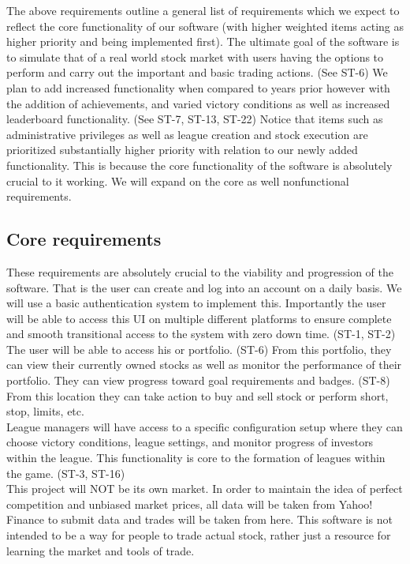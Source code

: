 The above requirements outline a general list of requirements which we expect to reflect the
core functionality of our software (with higher weighted items acting as higher priority and
being implemented first). The ultimate goal of the software is to simulate that of a real
world stock market with users having the options to perform and carry out the important and
basic trading actions. (See ST-6) We plan to add increased functionality when compared to years
prior however with the addition of achievements, and varied victory conditions as well as
increased leaderboard functionality. (See ST-7, ST-13, ST-22)   Notice that items such as
administrative privileges as well as league creation and stock execution are prioritized
substantially higher priority with relation to our newly added functionality. This is because
the core functionality of the software is absolutely crucial to it working. We will expand on
the core as well nonfunctional requirements. \\

\subsection{Core requirements}

These requirements are absolutely crucial to the viability and progression of the software.
That is the user can create and log into an account on a daily basis. We will use a basic
authentication system to implement this. Importantly the user will be able to access this
UI on multiple different platforms to ensure complete and smooth transitional access to the
system with zero down time. (ST-1, ST-2) \\

The user will be able to access his or portfolio. (ST-6) From this portfolio, they can view
their currently owned stocks as well as monitor the performance of their portfolio. They can
view progress toward goal requirements and badges. (ST-8) From this location they can take
action to buy and sell stock or perform short, stop, limits, etc. \\

League managers will have access to a specific configuration setup where they can choose
victory conditions, league settings, and monitor progress of investors within the league.
This functionality is core to the formation of leagues within the game. (ST-3, ST-16)\\

This project will NOT be its own market. In order to maintain the idea of perfect competition
and unbiased market prices, all data will be taken from Yahoo! Finance to submit data and
trades will be taken from here. This software is not intended to be a way for people to
trade actual stock, rather just a resource for learning the market and tools of trade. \\



